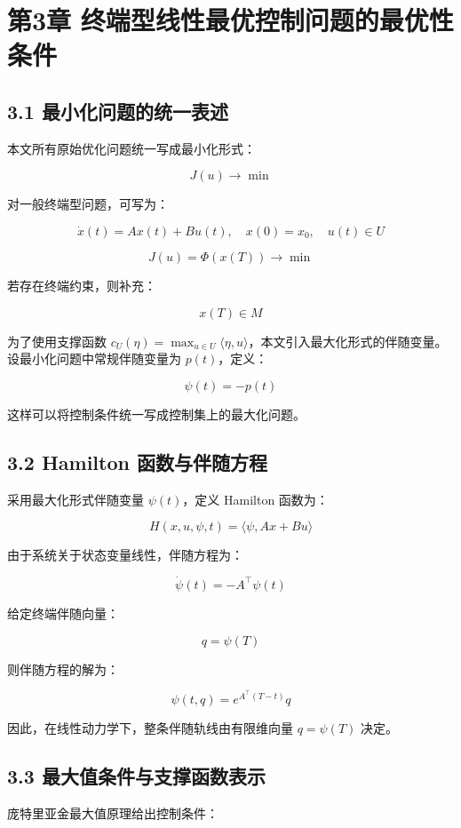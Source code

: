 \documentclass[UTF8,a4paper,zihao=-4]{ctexart}
\begin{document}
\section{第3章 终端型线性最优控制问题的最优性条件}

\subsection{3.1 最小化问题的统一表述}

本文所有原始优化问题统一写成最小化形式：

\[
J(u)\to\min
\]

对一般终端型问题，可写为：

\[
\dot{x}(t)=Ax(t)+Bu(t),\quad x(0)=x_0,\quad u(t)\in U
\]

\[
J(u)=\Phi(x(T))\to\min
\]

若存在终端约束，则补充：

\[
x(T)\in M
\]

为了使用支撑函数 $c_U(\eta)=\max_{u\in U}\langle\eta,u\rangle$，本文引入最大化形式的伴随变量。设最小化问题中常规伴随变量为 $p(t)$，定义：

\[
\psi(t)=-p(t)
\]

这样可以将控制条件统一写成控制集上的最大化问题。

\subsection{3.2 Hamilton 函数与伴随方程}

采用最大化形式伴随变量 $\psi(t)$，定义 Hamilton 函数为：

\[
H(x,u,\psi,t)=\langle \psi,Ax+Bu\rangle
\]

由于系统关于状态变量线性，伴随方程为：

\[
\dot{\psi}(t)=-A^\top\psi(t)
\]

给定终端伴随向量：

\[
q=\psi(T)
\]

则伴随方程的解为：

\[
\psi(t,q)=e^{A^\top(T-t)}q
\]

因此，在线性动力学下，整条伴随轨线由有限维向量 $q=\psi(T)$ 决定。

\subsection{3.3 最大值条件与支撑函数表示}

庞特里亚金最大值原理给出控制条件\cite[第23--27页]{pontryagin1969}\cite[第336--371页]{lee1972}\cite[第8--15页]{blagodatskikh2001}：
\end{document}
